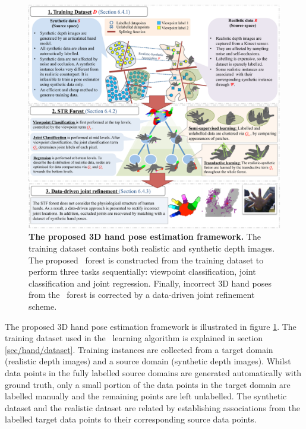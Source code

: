 \begin{figure}[ht]
	\includegraphics[width=1.00\linewidth]{fig/hand/overview2.pdf}
	\caption{
		\textbf{The proposed 3D hand pose estimation framework.} The training dataset contains both realistic and synthetic depth images. The proposed \STR\ forest is constructed from the training dataset to perform three tasks sequentially: viewpoint classification, joint classification and joint regression. Finally, incorrect 3D hand poses from the \STR\ forest is corrected by a data-driven joint refinement scheme. }
	\label{fig/hand/concept}
\end{figure}


The proposed 3D hand pose estimation framework is illustrated in figure \ref{fig/hand/concept}.
The training dataset used in the \STR\ learning algorithm is explained in section \ref{sec/hand/dataset}.
Training instances are collected from a target domain (realistic depth images) and a source domain (synthetic depth images). Whilst data points in the fully labelled source domains are generated automatically with ground truth, only a small portion of the data points in the target domain are labelled manually and the remaining points are left unlabelled. The synthetic dataset and the realistic dataset are related by establishing associations from the labelled target data points to their corresponding source data points.

